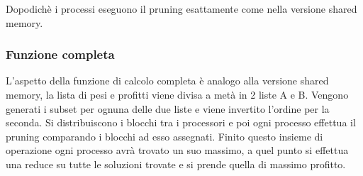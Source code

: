 \documentclass[11pt]{article}
\begin{document}
Dopodichè i processi eseguono il pruning esattamente come nella versione shared memory.

\subsubsection{Funzione completa}

L'aspetto della funzione di calcolo completa è analogo alla versione shared memory, la lista di pesi e profitti viene divisa a metà in 2 liste A e B. Vengono generati i subset per ognuna delle due liste e viene invertito l'ordine per la seconda. Si distribuiscono i blocchi tra i processori e poi ogni processo effettua il pruning comparando i blocchi ad esso assegnati. Finito questo insieme di operazione ogni processo avrà trovato un suo massimo, a quel punto si effettua una reduce su tutte le soluzioni trovate e si prende quella di massimo profitto.
\end{document}
